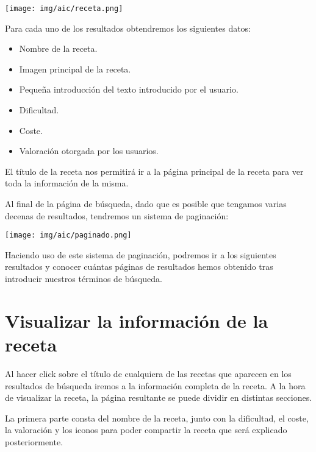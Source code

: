 \documentclass{\ClassPath/viu-tfm-template}
\begin{document}
\begin{center}
    \vspace{-10pt}
    \texttt{[image: img/aic/receta.png]}
    \vspace{-20pt}
\end{center}

Para cada uno de los resultados obtendremos los siguientes datos:

\begin{itemize}
    \item Nombre de la receta.
    \item Imagen principal de la receta.
    \item Pequeña introducción del texto introducido por el usuario.
    \item Dificultad.
    \item Coste.
    \item Valoración otorgada por los usuarios.
\end{itemize}

El título de la receta nos permitirá ir a la página principal de la receta para ver toda la información de la misma.

Al final de la página de búsqueda, dado que es posible que tengamos varias decenas de resultados, tendremos un sistema de paginación:

\begin{center}
    \vspace{-10pt}
    \texttt{[image: img/aic/paginado.png]}
    \vspace{-20pt}
\end{center}

Haciendo uso de este sistema de paginación, podremos ir a los siguientes resultados y conocer cuántas páginas de resultados hemos obtenido tras introducir nuestros términos de búsqueda.

\section{Visualizar la información de la receta}

Al  hacer click sobre el título de cualquiera de las recetas que aparecen en los resultados de búsqueda iremos a la información completa de la receta. A la hora de visualizar la receta, la página resultante se puede dividir en distintas secciones.

La primera parte consta del nombre de la receta, junto con la dificultad, el coste, la valoración y los iconos para poder compartir la receta que será explicado posteriormente.
\end{document}
